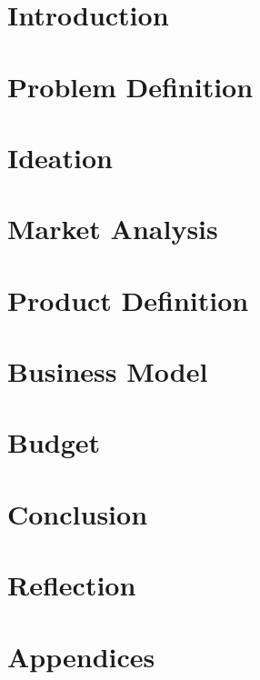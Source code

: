 \documentclass[11pt, a4paper]{article}
\begin{document}
\begin{multicols}{2}
	



\section{Introduction}
\label{sec:intro}


\section{Problem Definition}
\label{sec:problemDefinition}


\section{Ideation}
\label{sec:ideation}


\section{Market Analysis}
\label{sec:marketanlysis}


\section{Product Definition}
\label{sec:productDefinition}


\section{Business Model}
\label{sec:businessModel}


\section{Budget}
\label{sec:budget}


\section{Conclusion}
\label{sec:conclusion}


\section{Reflection}
\label{sec:reflection}


\newpage



\listoftables
\listoffigures

\end{multicols}
\label{end}
\newpage
\section*{\Huge{Appendices}}

\end{document}
